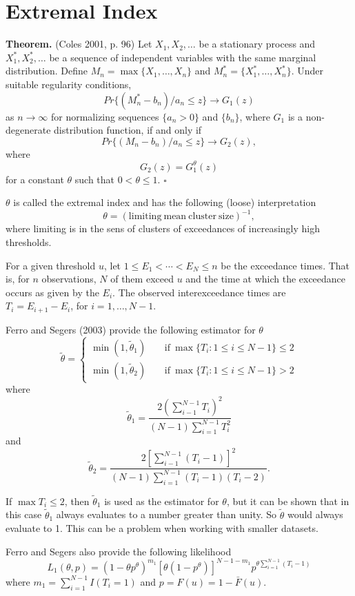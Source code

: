 \documentclass[12pt]{article}
\begin{document}
\section{Extremal Index}

\textbf{Theorem.} (Coles 2001, p. 96) Let $X_1,X_2,\ldots$ be a stationary process and $X_1^*,X_2^*,\ldots$ be a sequence of independent variables with the same marginal distribution. Define $M_n=\max\{X_1,\ldots,X_n\}$ and $M_n^*=\{X_1^*,\ldots,X_n^*\}$. Under suitable regularity conditions,
\[ Pr\{(M_n^*-b_n)/a_n\leq z\} \rightarrow G_1(z) \]
as $n\rightarrow\infty$ for normalizing sequences $\{a_n > 0\}$ and $\{b_n\}$, where $G_1$ is a non-degenerate distribution function, if and only if
\[ Pr\{(M_n-b_n)/a_n\leq z\} \rightarrow G_2(z), \]
where
\[ G_2(z)=G_1^\theta(z) \]
for a constant $\theta$ such that $0<\theta\leq 1$. \hfill $\square$
\bigskip

$\theta$ is called the extremal index and has the following (loose) interpretation
\[ \theta = (\mathrm{limiting~mean~cluster~size})^{-1}, \]
where limiting is in the sens of clusters of exceedances of increasingly high thresholds.
\bigskip

For a given threshold $u$, let $1\leq E_1 < \cdots < E_N \leq n$ be the exceedance times. That is, for $n$ observations, $N$ of them exceed $u$ and the time at which the exceedance occurs as given by the $E_i$. The observed interexceedance times are $T_i=E_{i+1}-E_i$, for $i=1,\ldots,N-1$.
\bigskip

Ferro and Segers (2003) provide the following estimator for $\theta$
\[ \widetilde{\theta}=\begin{cases} \min(1, \tilde{\theta}_1) & \mathrm{~~~~~if~} \max\{T_i: 1\leq i \leq N-1\} \leq 2  \\ \min(1, \tilde{\theta}_2) & \mathrm{~~~~~if~} \max\{T_i:1\leq i \leq N-1\} > 2 \end{cases} \]
where
\[ \tilde{\theta}_1 = \frac{2\left(\sum_{i-1}^{N-1}T_i\right)^2}{(N-1)\sum_{i=1}^{N-1}T_i^2} \]
and
\[ \tilde{\theta}_2 = \frac{2\left[\sum_{i-1}^{N-1}(T_i-1)\right]^2}{(N-1)\sum_{i=1}^{N-1}(T_i-1)(T_i-2)}. \]
\bigskip

If $\max{T_i}\leq 2$, then $\tilde{\theta}_1$ is used as the estimator for $\theta$, but it can be shown that in this case $\tilde{\theta}_1$ always evaluates to a number greater than unity. So $\widetilde{\theta}$ would always evaluate to 1. This can be a problem when working with smaller datasets.
\bigskip

Ferro and Segers also provide the following likelihood
\[ L_1(\theta, p) = (1-\theta p^\theta)^{m_1}[\theta(1-p^\theta)]^{N-1-m_1}p^{\theta\sum_{i=1}^{N-1}(T_i-1)} \]
where $m_1=\sum_{i=1}^{N-1}I(T_i=1)$ and $p=F(u)=1-\bar{F}(u)$.
\bigskip
\end{document}
